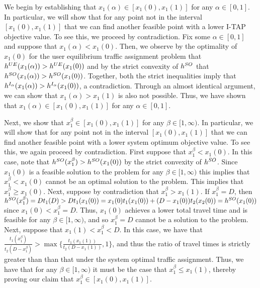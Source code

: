 \documentclass{article}
\begin{document}
We begin by establishing that $x_1(\alpha) \in [x_1(0), x_1(1)]$ for any $\alpha \in [0, 1]$. In particular, we will show that for any point not in the interval $[x_1(0), x_1(1)]$ that we can find another feasible point with a lower I-TAP objective value. To see this, we proceed by contradiction. Fix some $\alpha \in [0, 1]$ and suppose that $x_1(\alpha) < x_1(0)$. Then, we observe by the optimality of $x_1(0)$ for the user equilibrium traffic assignment problem that $h^{UE}(x_1(\alpha))>h^{UE}(x_1(0))$ and by the strict convexity of $h^{SO}$ that $h^{SO}(x_1(\alpha))> h^{SO}(x_1(0))$. Together, both the strict inequalities imply that $h^{I_{\alpha}}(x_1(\alpha))>h^{I_{\alpha}}(x_1(0))$, a contradiction. Through an almost identical argument, we can show that $x_1(\alpha)>x_1(1)$ is also not possible. Thus, we have shown that $x_1(\alpha) \in [x_1(0), x_1(1)]$ for any $\alpha \in [0, 1]$.

Next, we show that $x_1^{\beta} \in [x_1(0), x_1(1)]$ for any $\beta \in [1, \infty)$. In particular, we will show that for any point not in the interval $[x_1(0), x_1(1)]$ that we can find another feasible point with a lower system optimum objective value. To see this, we again proceed by contradiction. First suppose that $x_1^{\beta} < x_1(0)$. In this case, note that $h^{SO}(x_1^{\beta}) > h^{SO}(x_1(0))$ by the strict convexity of $h^{SO}$. Since $x_1(0)$ is a feasible solution to the \fso problem for any $\beta \in [1, \infty)$ this implies that $x_1^{\beta} < x_1(0)$ cannot be an optimal solution to the \fso problem. This implies that $x_1^{\beta} \geq x_1(0)$. Next, suppose by contradiction that $x_1^{\beta}>x_1(1)$. If $x_1^{\beta} = D$, then $h^{SO}(x_1^{\beta}) = D t_1(D) > D t_1(x_1(0)) = x_1(0) t_1(x_1(0)) + (D-x_1(0)) t_2(x_2(0)) = h^{SO}(x_1(0))$ since $x_1(0) < x_1^{\beta} = D$. Thus, $x_1(0)$ achieves a lower total travel time and is feasible for any $\beta \in [1, \infty)$, and so $x_1^{\beta} = D$ cannot be a solution to the \fso problem. Next, suppose that $x_1(1)<x_1^{\beta} < D$. In this case, we have that $\frac{t_1(x_1^{\beta})}{t_2(D - x_1^{\beta})} > \max \{ \frac{t_1(x_1(1))}{t_2(D - x_1(1))}, 1 \}$, and thus the ratio of travel times is strictly greater than than that under the system optimal traffic assignment. Thus, we have that for any $\beta \in [1, \infty)$ it must be the case that $x_1^{\beta} \leq x_1(1)$, thereby proving our claim that $x_1^{\beta} \in [x_1(0), x_1(1)]$.
\end{document}
